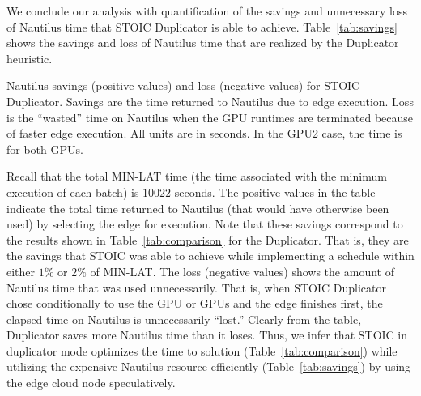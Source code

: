 We conclude our analysis with quantification of the savings and unnecessary loss of Nautilus time that STOIC Duplicator is able to achieve. Table~\ref{tab:savings} shows the savings and loss of Nautilus time that are realized by the Duplicator heuristic.

%
%

\begin{table}[t] 
\centering
\resizebox{300pt}{!}{

}
\caption{
Nautilus savings (positive values) and loss (negative values) for STOIC Duplicator. Savings are the time returned to Nautilus due to edge execution. Loss is the ``wasted'' time on Nautilus when the GPU runtimes are terminated because of faster edge execution. All units are in seconds. In the GPU2 case, the time is for both GPUs.}
\label{tab:savings}
\end{table}

Recall that the total MIN-LAT time (the time associated with the minimum execution of each batch) is $10022$ seconds. The positive values in the table indicate the total time returned to Nautilus (that would have otherwise been used) by selecting the edge for execution.  Note that these savings correspond to the results shown in Table~\ref{tab:comparison} for the Duplicator. That is, they are the savings that STOIC was able to achieve while implementing a schedule within either $1\%$ or $2\%$ of MIN-LAT.  The loss (negative values) shows the amount of Nautilus time that was used unnecessarily. That is, when STOIC Duplicator chose conditionally to use the GPU or GPUs and the edge finishes first, the elapsed time on Nautilus is unnecessarily ``lost.'' Clearly from the table, Duplicator saves more Nautilus time than it loses. Thus, we infer that STOIC in duplicator mode optimizes the time to solution (Table~\ref{tab:comparison}) while utilizing the expensive Nautilus resource efficiently (Table~\ref{tab:savings}) by using the edge cloud node speculatively.  


